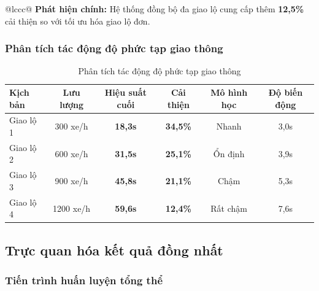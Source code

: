 \begin{table}[!htp]
\begin{tabular}{@{}lccc@{}}
\textbf{Phát hiện chính:} Hệ thống đồng bộ đa giao lộ cung cấp thêm \textbf{12,5\%} 
cải thiện so với tối ưu hóa giao lộ đơn.

\subsubsection{Phân tích tác động độ phức tạp giao thông}

\begin{table}[!htp]
    \centering
    \caption{Phân tích tác động độ phức tạp giao thông}
    \label{tab:traffic_complexity_analysis}
    \begin{tabular}{@{}lccccc@{}}
        \toprule 
        \textbf{Kịch bản} & \textbf{Lưu lượng} & \textbf{Hiệu suất cuối} & \textbf{Cải thiện} & \textbf{Mô hình học} & \textbf{Độ biến động} \\
        \midrule 
        Giao lộ 1 & 300 xe/h & \textbf{18,3s} & \textbf{34,5\%} & Nhanh & 3,0s \\
        Giao lộ 2 & 600 xe/h & \textbf{31,5s} & \textbf{25,1\%} & Ổn định & 3,9s \\
        Giao lộ 3 & 900 xe/h & \textbf{45,8s} & \textbf{21,1\%} & Chậm & 5,3s \\
        Giao lộ 4 & 1200 xe/h & \textbf{59,6s} & \textbf{12,4\%} & Rất chậm & 7,6s \\
        \bottomrule
    \end{tabular}
\end{table}

\subsection{Trực quan hóa kết quả đồng nhất}

\subsubsection{Tiến trình huấn luyện tổng thể}


\end{tabular}
\end{table}
